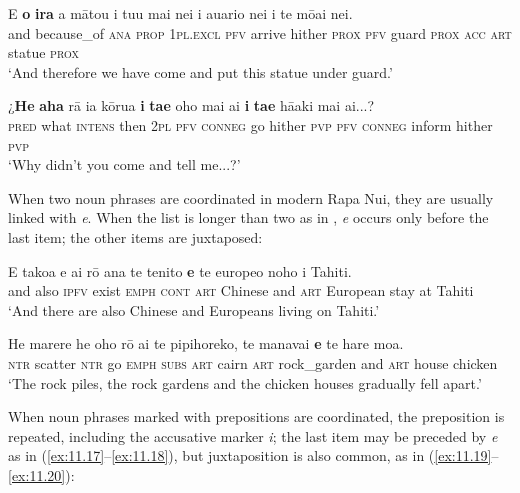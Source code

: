 \ea\label{ex:11.13}
\gll {\ꞌ}E \textbf{{\ꞌ}o} \textbf{ira} a mātou i tu{\ꞌ}u mai nei i {\ꞌ}auario nei  i te mōai nei.\\
and because\_of \textsc{ana} \textsc{prop} \textsc{1pl.excl} \textsc{pfv} arrive hither \textsc{prox} \textsc{pfv} guard \textsc{prox}  \textsc{acc} \textsc{art} statue \textsc{prox}\\

\glt 
‘And therefore we have come and put this statue under guard.’ \textstyleExampleref{[R650.034]} 
\z

\ea\label{ex:11.14}
\gll ¿\textbf{He} \textbf{aha} rā ia kōrua \textbf{i} \textbf{ta{\ꞌ}e} oho mai ai  \textbf{i} \textbf{ta{\ꞌ}e} hā{\ꞌ}aki mai ai...?\\
\textsc{pred} what \textsc{intens} then \textsc{2pl} \textsc{pfv} \textsc{conneg} go hither \textsc{pvp}  \textsc{pfv} \textsc{conneg} inform hither \textsc{pvp}\\

\glt 
‘Why didn’t you come and tell me...?’ \textstyleExampleref{[R313.106]} 
\z

When two noun phrases are coordinated in modern Rapa Nui, they are usually linked with \textit{{\ꞌ}e}. When the list is longer than two as in , \textit{{\ꞌ}e} occurs only before the last item; the other items are juxtaposed:

\ea\label{ex:11.15}
\gll {\ꞌ}E tako{\ꞌ}a e ai rō {\ꞌ}ana te tenito \textbf{{\ꞌ}e} te europeo noho {\ꞌ}i Tahiti. \\
and also \textsc{ipfv} exist \textsc{emph} \textsc{cont} \textsc{art} Chinese and \textsc{art} European stay at Tahiti \\

\glt 
‘And there are also Chinese and Europeans living on Tahiti.’ \textstyleExampleref{[R348.011]} 
\z

\ea\label{ex:11.16}
\gll He marere he oho rō {\ꞌ}ai te pipihoreko, te manavai  \textbf{{\ꞌ}e} te hare moa.\\
\textsc{ntr} scatter \textsc{ntr} go \textsc{emph} \textsc{subs} \textsc{art} cairn \textsc{art} rock\_garden  and \textsc{art} house chicken\\

\glt
‘The rock piles, the rock gardens and the chicken houses gradually fell apart.’ \textstyleExampleref{[R621.018]} 
\z

When noun phrases marked with prepositions are coordinated, the preposition is repeated, including the accusative marker \textit{i}; the last item may be preceded by \textit{{\ꞌ}e} as in (\ref{ex:11.17}–\ref{ex:11.18}), but juxtaposition is also common, as in (\ref{ex:11.19}–\ref{ex:11.20}):

